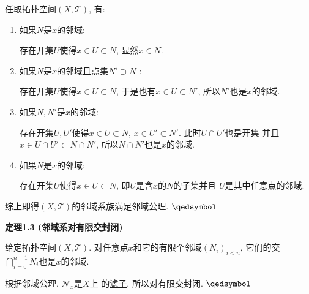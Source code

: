 \documentclass[UTF8]{ctexart}
\begin{document}
任取拓扑空间$(X,\mathcal{T})$, 有:
\begin{enumerate}
    \item 如果$N$是$x$的邻域:
    
    \hspace{2.17em}
    存在开集$U$使得$x\in U\subset N$, 显然$x\in N$.

    \item 如果$N$是$x$的邻域且点集$N'\supset N$ :
    
    \hspace{2.17em}
    存在开集$U$使得$x\in U\subset N$, 于是也有$x\in U\subset N'$,
    所以$N'$也是$x$的邻域.

    \item 如果$N,N'$是$x$的邻域:
    
    \hspace{2.17em}
    存在开集$U,U'$使得$x\in U\subset N,\,x\in U'\subset N'$. 此时$U\cap U'$也是开集
    并且$x\in U\cap U'\subset N\cap N'$, 所以$N\cap N'$也是$x$的邻域.

    \item 如果$N$是$x$的邻域:
    
    \hspace{2.17em}
    存在开集$U$使得$x\in U\subset N$, 即$U$是含$x$的$N$的子集并且
    $U$是其中任意点的邻域.
\end{enumerate}
综上即得$(X,\mathcal{T})$的邻域系族满足邻域公理. \hfill $\qedsymbol$



\vspace{10pt}

\hypertarget{sec:定理1.3}{}
\noindent\textbf{定理1.3 (邻域系对有限交封闭)}

给定拓扑空间$(X,\mathcal{T})$. 对任意点$x$和它的有限个邻域$(N_i)_{i<n}$,
它们的交$\displaystyle\bigcap_{i=0}^{n-1}N_i$也是$x$的邻域.


根据邻域公理, $\mathcal{N}_x$是$X$上
的\href{../../01 基础集合论/06 滤子/01 滤子#nameddest=sec:定义1.1}{滤子},
所以对有限交封闭. \hfill $\qedsymbol$
\end{document}
